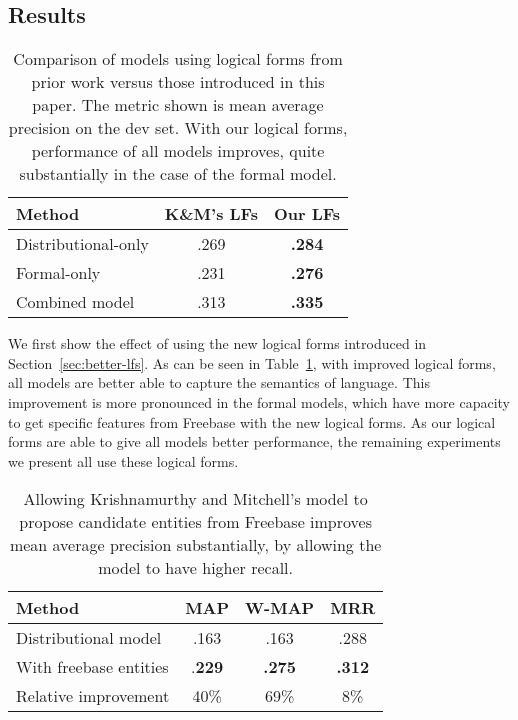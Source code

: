 \documentclass[11pt]{article}
\newcommand{\secref}[1]{Section~\ref{sec:#1}}
\newcommand{\tabref}[1]{Table~\ref{tab:#1}}
\begin{document}
\subsection{Results}

\begin{table}
  \centering
  {\small
    \begin{tabular}{lcc}
      \toprule
      Method & K\&M's LFs & Our LFs \\
      \midrule
      Distributional-only & .269 & \textbf{.284} \\
      \midrule
      Formal-only & .231 & \textbf{.276} \\
      \midrule
      Combined model & .313 & \textbf{.335} \\
      \bottomrule
    \end{tabular}
  }
  \caption{Comparison of models using logical forms from prior work
  versus those introduced in this paper.  The metric shown is mean
  average precision on the dev set.  With our logical forms,
  performance of all models improves, quite substantially in the case
  of the formal model.}
  \label{tab:better-lfs}
\end{table}

We first show the effect of using the new logical forms introduced in
\secref{better-lfs}.  As can be seen in \tabref{better-lfs}, with
improved logical forms, all models are better able to capture the
semantics of language.  This improvement is more pronounced in the
formal models, which have more capacity to get specific features from
Freebase with the new logical forms.  As our logical forms are able to
give all models better performance, the remaining experiments we
present all use these logical forms.

\begin{table}
  \centering
  {\small
    \begin{tabular}{lccc}
      \toprule
      Method & MAP & W-MAP & MRR \\
      \midrule
      Distributional model & .163 & .163 & .288 \\
      \midrule
      With freebase entities & .\textbf{229} & \textbf{.275} & \textbf{.312} \\
      \bottomrule
      Relative improvement & 40\% & 69\% & 8\% \\
      \bottomrule
    \end{tabular}
  }
  \caption{Allowing Krishnamurthy and Mitchell's model to propose
  candidate entities from Freebase improves mean average precision
  substantially, by allowing the model to have higher recall.}
  \label{tab:better-candidates}
\end{table}
\end{document}
